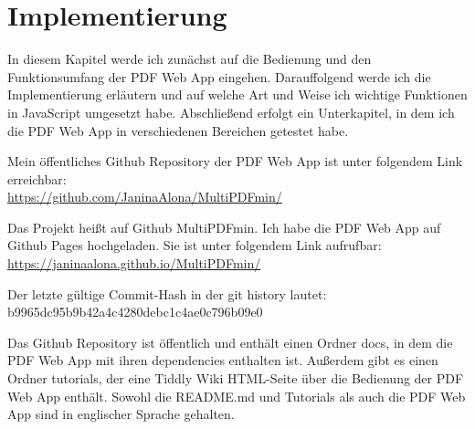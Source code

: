 \chapter{Implementierung}
In diesem Kapitel werde ich zunächst auf die Bedienung und den Funktionsumfang der PDF Web App eingehen. Darauffolgend werde ich die Implementierung erläutern und auf welche Art und Weise ich wichtige Funktionen in JavaScript umgesetzt habe. Abschließend erfolgt ein Unterkapitel, in dem ich die PDF Web App in verschiedenen Bereichen getestet habe.

Mein öffentliches Github Repository der PDF Web App ist unter folgendem Link erreichbar: \\
\url{https://github.com/JaninaAlona/MultiPDFmin/}

Das Projekt heißt auf Github MultiPDFmin. Ich habe die PDF Web App auf Github Pages hochgeladen. Sie ist unter folgendem Link aufrufbar: \\
\url{https://janinaalona.github.io/MultiPDFmin/}

Der letzte gültige Commit-Hash in der git history lautet: \\
b9965dc95b9b42a4c4280debc1c4ae0c796b09e0

Das Github Repository ist öffentlich und enthält einen Ordner docs, in dem die PDF Web App mit ihren dependencies enthalten ist. Außerdem gibt es einen Ordner tutorials, der eine Tiddly Wiki HTML-Seite über die Bedienung der PDF Web App enthält. Sowohl die README.md und Tutorials als auch die PDF Web App sind in englischer Sprache gehalten.



